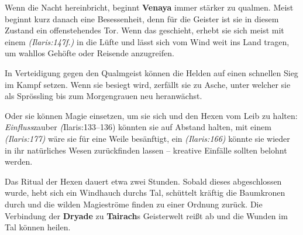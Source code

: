Wenn die Nacht hereinbricht, beginnt \textbf{Venaya} immer stärker zu qualmen.
Meist beginnt kurz danach eine Besessenheit, denn für die Geister ist sie in diesem Zustand ein offenstehendes Tor.
Wenn das geschieht, erhebt sie sich meist mit einem  \emph{(Ilaris:147f.)} in die Lüfte und lässt sich vom Wind weit ins Land tragen, um wahllos Gehöfte oder Reisende anzugreifen.


In Verteidigung gegen den Qualmgeist können die Helden auf einen schnellen Sieg im Kampf setzen.
Wenn sie besiegt wird, zerfällt sie zu Asche, unter welcher sie als Sprössling bis zum Morgengrauen neu heranwächst.

Oder sie können Magie einsetzen, um sie sich und den Hexen vom Leib zu halten:
\textit{Einfluss}zauber \emph(Ilaris:133--136) könnten sie auf Abstand halten, mit einem  \emph{(Ilaris:177)} wäre sie für eine Weile besänftigt, ein  \emph{(Ilaris:166)} könnte sie wieder in ihr natürliches Wesen zurückfinden lassen -- kreative Einfälle sollten belohnt werden.

Das Ritual der Hexen dauert etwa zwei Stunden. Sobald dieses abgeschlossen wurde, hebt sich ein Windhauch durchs Tal, schüttelt kräftig die Baumkronen durch und die wilden Magieströme finden zu einer Ordnung zurück.
Die Verbindung der \textbf{Dryade} zu \textbf{Tairach}s Geisterwelt reißt ab und die Wunden im Tal können heilen.


